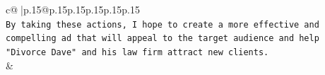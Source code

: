 \documentclass{article}
\begin{document}
{\begin{supertabular}{c@{$\;$}|p{.15\linewidth}@{}p{.15\linewidth}p{.15\linewidth}p{.15\linewidth}p{.15\linewidth}p{.15\linewidth}}
{{{\\ 
\texttt{By taking these actions, I hope to create a more effective and compelling ad that will appeal to the target audience and help "Divorce Dave" and his law firm attract new clients.} \\
            }
        }
    }
    & \\ \\

\end{supertabular}
}
\end{document}
